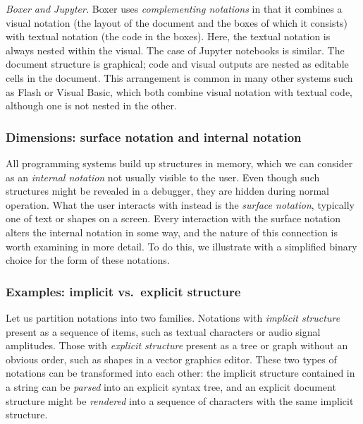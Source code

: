 \documentclass[english,submission]{programming}
\begin{document}
\emph{Boxer and Jupyter.} Boxer \cite{Boxer} uses \emph{complementing
notations} in that it combines a visual notation (the layout of the
document and the boxes of which it consists) with textual notation (the
code in the boxes). Here, the textual notation is always nested within
the visual. The case of Jupyter notebooks is similar. The document
structure is graphical; code and visual outputs are nested as editable
cells in the document. This arrangement is common in many other systems
such as Flash or Visual Basic, which both combine visual notation with
textual code, although one is not nested in the other.

\hypertarget{dimensions-surface-notation-and-internal-notation}{%
\subsubsection{Dimensions: surface notation and internal
notation}\label{dimensions-surface-notation-and-internal-notation}}

All programming systems build up structures in memory, which we can
consider as an \emph{internal notation} not usually visible to the user.
Even though such structures might be revealed in a debugger, they are
hidden during normal operation. What the user interacts with instead is
the \emph{surface notation}, typically one of text or shapes on a
screen. Every interaction with the surface notation alters the internal
notation in some way, and the nature of this connection is worth
examining in more detail. To do this, we illustrate with a simplified
binary choice for the form of these notations.

\hypertarget{examples-implicit-vs.-explicit-structure}{%
\subsubsection{Examples: implicit vs.~explicit
structure}\label{examples-implicit-vs.-explicit-structure}}

Let us partition notations into two families. Notations with
\emph{implicit structure} present as a sequence of items, such as
textual characters or audio signal amplitudes. Those with \emph{explicit
structure} present as a tree or graph without an obvious order, such as
shapes in a vector graphics editor. These two types of notations can be
transformed into each other: the implicit structure contained in a
string can be \emph{parsed} into an explicit syntax tree, and an
explicit document structure might be \emph{rendered} into a sequence of
characters with the same implicit structure.
\end{document}
